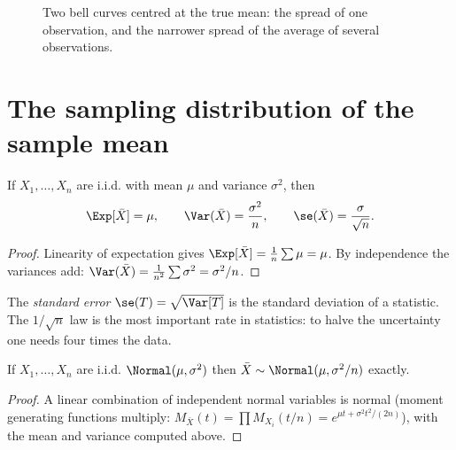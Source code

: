 \begin{figure}[h]
\centering
{}
\caption{Two bell curves centred at the true mean: the spread of one observation, and the narrower spread of the average of several observations.}
\end{figure}

\section{The sampling distribution of the sample mean}

\begin{theorem}\label{thm:xbar}
If $X_1,\dots,X_n$ are i.i.d. with mean $\mu$ and variance $\sigma^2$, then
\[ \Exp[\bar{X}]=\mu,\qquad\Var(\bar{X})=\frac{\sigma^2}n,\qquad\se(\bar{X})=\frac{\sigma}{\sqrt n}. \]
\end{theorem}

\begin{proof}
Linearity of expectation gives $\Exp[\bar{X}]=\frac1n\sum\mu=\mu$. By independence the variances add: $\Var(\bar{X})=\frac1{n^2}\sum\sigma^2=\sigma^2/n$.
\end{proof}

The \emph{standard error} $\se(T)=\sqrt{\Var[T]}$ is the standard deviation of a statistic. The $1/\sqrt n$ law is the most important rate in statistics: to halve the uncertainty one needs four times the data.

\begin{theorem}\label{thm:normalmean}
If $X_1,\dots,X_n$ are i.i.d. $\Normal(\mu,\sigma^2)$ then $\bar{X}\sim\Normal(\mu,\sigma^2/n)$ exactly.
\end{theorem}

\begin{proof}
A linear combination of independent normal variables is normal (moment generating functions multiply: $M_{\bar{X}}(t)=\prod M_{X_i}(t/n)=e^{\mu t+\sigma^2t^2/(2n)}$), with the mean and variance computed above.
\end{proof}

